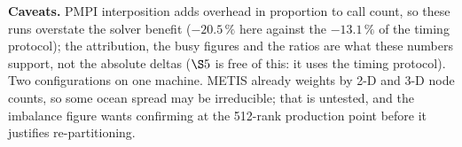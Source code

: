 \documentclass[10pt,a4paper]{article}
\begin{document}
\textbf{Caveats.} PMPI interposition adds overhead in proportion to call count, so these runs
overstate the solver benefit ($-20.5\,\%$ here against the $-13.1\,\%$ of the timing protocol);
the attribution, the busy figures and the ratios are what these numbers support, not the
absolute deltas ($\S5$ is free of this: it uses the timing protocol). Two configurations on
one machine. METIS already weights by 2-D and 3-D node counts, so some ocean spread may be
irreducible; that is untested, and the imbalance figure wants confirming at the 512-rank
production point before it justifies re-partitioning.
\end{document}
